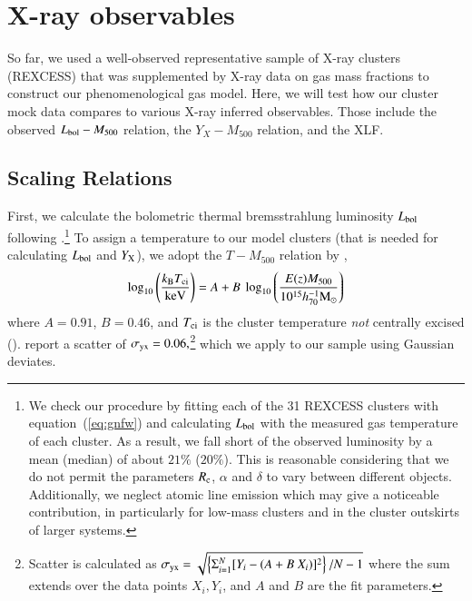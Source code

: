 \documentclass[useAMS,usenatbib]{mn2e}
\begin{document}
\section{X-ray  observables}
\label{sec:4}

So far, we used a well-observed representative sample of X-ray clusters
(REXCESS) that was supplemented by X-ray data on gas mass fractions to construct
our phenomenological gas model.  Here, we will test how our cluster mock data
compares to various X-ray inferred observables. Those include the observed
$L_{{\mathrm{bol}}} - M_{500}$ relation, the $Y_X - M_{500}$ relation, and the
XLF.

\subsection{Scaling Relations}

First, we calculate the bolometric thermal bremsstrahlung luminosity
$L_{{\mathrm{bol}}}$ following \cite{1988xrec.book.....S}.\footnote{We check our
  procedure by fitting each of the 31 REXCESS clusters with
  equation~(\ref{eq:gnfw}) and calculating $L_{{\mathrm{bol}}}$ with the measured gas
  temperature of each cluster. As a result, we fall short of the observed
  luminosity by a mean (median) of about $21\%$ ($20\%$). This is reasonable
  considering that we do not permit the parameters $R_{{\mathrm{c}}}$, $\alpha$ and
  $\delta$ to vary between different objects. Additionally, we neglect atomic
  line emission which may give a noticeable contribution, in particularly for
  low-mass clusters and in the cluster outskirts of larger systems.}  To assign
a temperature to our model clusters (that is needed for calculating
$L_{{\mathrm{bol}}}$ and $Y_{{\mathrm{X}}}$), we adopt the $T-M_{500}$ relation by
\cite{2010MNRAS.406.1773M},
\begin{equation}
\log_{10} \left( \frac{k_{{\mathrm{B}}}T_{{\mathrm{ci}}}}{{\mathrm{keV}}} \right) = 
A + B~\log_{10} \left( \frac{E(z) M_{500}}{10^{15} h_{70}^{-1} {\mathrm{M_{\odot}}}} \right)
\label{eq:temp}
\end{equation}
where $A=0.91$, $B=0.46$, and $T_{{\mathrm{ci}}}$ is the cluster temperature
\emph{not} centrally excised
(\citealp{2010MNRAS.406.1773M}). \cite{2010MNRAS.406.1773M} report a scatter of
$\sigma_{{\mathrm{yx}}} = 0.06,$\footnote{Scatter is calculated as $\sigma_{{\mathrm{yx}}}
  = \sqrt{ \left\{ \Sigma_{i=1}^{N} [Y_{i}-(A+B~X_{i})]^{2}\right\} / N-1}$
  where the sum extends over the data points $X_{i}, Y_{i}$, and $A$ and $B$ are
  the fit parameters.} which we apply to our sample using Gaussian deviates.
\end{document}
